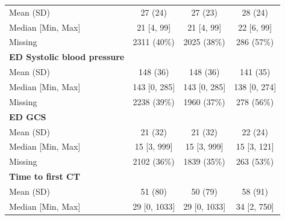 \documentclass[12pt, a4paper]{article}
\begin{document}
\begin{appendices}
\begin{table}[t!]
{\begin{tabular}{lccc}
                \hspace{3mm}Mean (SD)                         & 27 (24)           & 27 (23)           & 28 (24)          \\
                \hspace{3mm}Median [Min, Max]                 & 21 [4, 99]        & 21 [4, 99]        & 22 [6, 99]       \\
                \hspace{3mm}Missing                           & 2311 (40\%)       & 2025 (38\%)       & 286 (57\%)       \\
                \textbf{ED Systolic blood pressure}           &                   &                   &                  \\
                \hspace{3mm}Mean (SD)                         & 148 (36)          & 148 (36)          & 141 (35)         \\
                \hspace{3mm}Median [Min, Max]                 & 143 [0, 285]      & 143 [0, 285]      & 138 [0, 274]     \\
                \hspace{3mm}Missing                           & 2238 (39\%)       & 1960 (37\%)       & 278 (56\%)       \\
                \textbf{ED GCS}                               &                   &                   &                  \\
                \hspace{3mm}Mean (SD)                         & 21 (32)           & 21 (32)           & 22 (24)          \\
                \hspace{3mm}Median [Min, Max]                 & 15 [3, 999]       & 15 [3, 999]       & 15 [3, 121]      \\
                \hspace{3mm}Missing                           & 2102 (36\%)       & 1839 (35\%)       & 263 (53\%)       \\
                \textbf{Time to first CT}                     &                   &                   &                  \\
                \hspace{3mm}Mean (SD)                         & 51 (80)           & 50 (79)           & 58 (91)          \\
                \hspace{3mm}Median [Min, Max]                 & 29 [0, 1033]      & 29 [0, 1033]      & 34 [2, 750]      \\

\end{tabular}}
\end{table}
\end{appendices}
\end{document}
